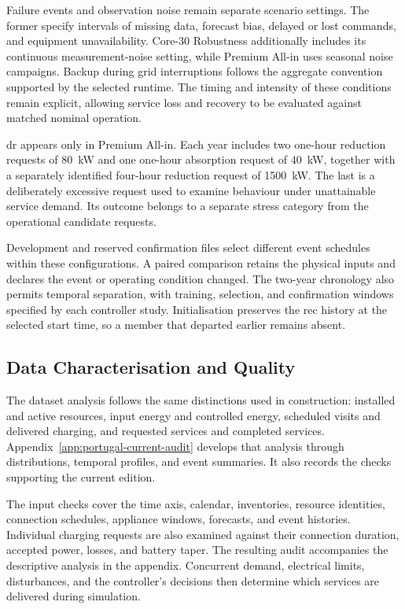 Failure events and observation noise remain separate scenario settings. The former specify intervals of missing data, forecast bias, delayed or lost commands, and equipment unavailability. Core-30 Robustness additionally includes its continuous measurement-noise setting, while Premium All-in uses seasonal noise campaigns. Backup during grid interruptions follows the aggregate convention supported by the selected runtime. The timing and intensity of these conditions remain explicit, allowing service loss and recovery to be evaluated against matched nominal operation.

\gls{dr} appears only in Premium All-in. Each year includes two one-hour reduction requests of 80~kW and one one-hour absorption request of 40~kW, together with a separately identified four-hour reduction request of 1500~kW. The last is a deliberately excessive request used to examine behaviour under unattainable service demand. Its outcome belongs to a separate stress category from the operational candidate requests.

Development and reserved confirmation files select different event schedules within these configurations. A paired comparison retains the physical inputs and declares the event or operating condition changed. The two-year chronology also permits temporal separation, with training, selection, and confirmation windows specified by each controller study. Initialisation preserves the \gls{rec} history at the selected start time, so a member that departed earlier remains absent.

\subsection{Data Characterisation and Quality}
\label{sec:sim-annual-baseline-audit}

The dataset analysis follows the same distinctions used in construction: installed and active resources, input energy and controlled energy, scheduled visits and delivered charging, and requested services and completed services. Appendix~\ref{app:portugal-current-audit} develops that analysis through distributions, temporal profiles, and event summaries. It also records the checks supporting the current edition.

The input checks cover the time axis, calendar, inventories, resource identities, connection schedules, appliance windows, forecasts, and event histories. Individual charging requests are also examined against their connection duration, accepted power, losses, and battery taper. The resulting audit accompanies the descriptive analysis in the appendix. Concurrent demand, electrical limits, disturbances, and the controller's decisions then determine which services are delivered during simulation.

